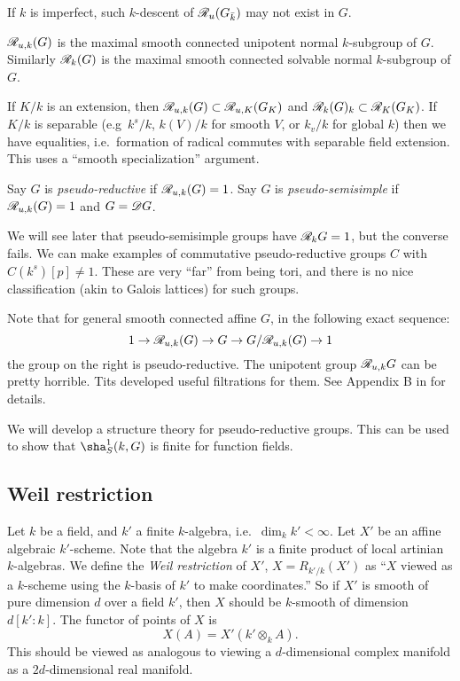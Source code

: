 If $k$ is imperfect, such $k$-descent of $\mathscr{R}_u(G_{\bar k})$ may not exist 
in $G$. 

\begin{defi}
$\mathscr{R}_{u,k}(G)$ is the maximal smooth connected unipotent normal $k$-subgroup of 
$G$. Similarly $\mathscr{R}_k(G)$ is the maximal smooth connected solvable normal 
$k$-subgroup of $G$. 
\end{defi}

If $K/k$ is an extension, then $\mathscr{R}_{u,k}(G)\subset \mathscr{R}_{u,K}(G_K)$ and 
$\mathscr{R}_k(G)_k\subset \mathscr{R}_K(G_K)$. If $K/k$ is separable (e.g~$k^s/k$, 
$k(V)/k$ for smooth $V$, or $k_v/k$ for global $k$) then we have equalities, 
i.e.\ formation of radical commutes with separable field extension. This uses 
a ``smooth specialization'' argument. 

\begin{defi}
Say $G$ is \emph{pseudo-reductive} if $\mathscr{R}_{u,k}(G)=1$. Say $G$ is 
\emph{pseudo-semisimple} if $\mathscr{R}_{u,k}(G)=1$ and $G=\mathscr{D} G$. 
\end{defi}
We will see later that pseudo-semisimple groups have $\mathscr{R}_k G=1$, but the 
converse fails. We can make examples of commutative pseudo-reductive groups 
$C$ with $C(k^s)[p]\ne 1$. These are very ``far'' from being tori, and there 
is no nice classification (akin to Galois lattices) for such groups. 

Note that for general smooth connected affine $G$, in the following exact sequence:
\[
  1 \to \mathscr{R}_{u,k}(G) \to G \to G/\mathscr{R}_{u,k}(G) \to 1
\]
the group on the right is pseudo-reductive. The unipotent group 
$\mathscr{R}_{u,k} G$ can be pretty horrible. Tits developed useful filtrations for 
them. See Appendix B in \cite{cgp10} for details. 

We will develop a structure theory for pseudo-reductive groups. This can 
be used to show that $\sha_S^1(k,G)$ is finite for function fields. 





\subsection{Weil restriction}

Let $k$ be a field, and $k'$ a finite $k$-algebra, i.e.~$\dim_k k'<\infty$. Let 
$X'$ be an affine algebraic $k'$-scheme. Note that the algebra $k'$ is a finite 
product of local artinian $k$-algebras. We define the \emph{Weil restriction} 
of $X'$, $X=R_{k'/k}(X')$ as ``$X$ viewed as a $k$-scheme using the $k$-basis of 
$k'$ to make coordinates.'' So if $X'$ is smooth of pure dimension $d$ over a 
field $k'$, then $X$ should be $k$-smooth of dimension $d[k':k]$. The 
functor of points of $X$ is 
\[
  X(A) = X'(k'\otimes_k A) .
\]
This should be viewed as analogous to viewing a $d$-dimensional complex 
manifold as a $2d$-dimensional real manifold. 

